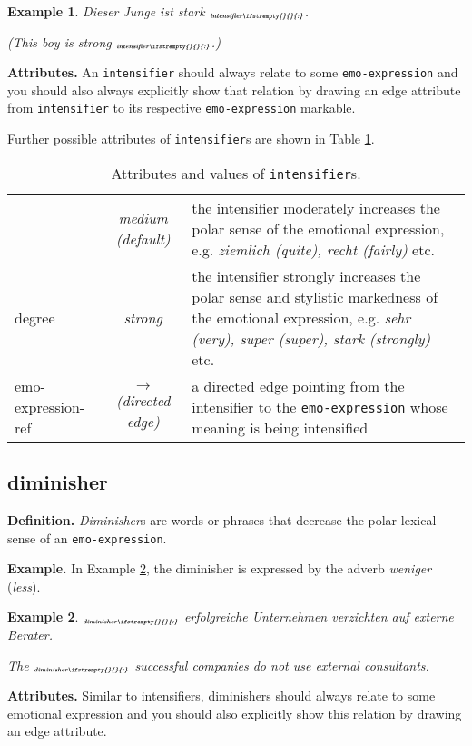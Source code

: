 \documentclass[11pt,a4paper]{article}
\newlength{\clmnwidth}
\theoremstyle{mytheoremstyle}
\newtheorem{exmp}{Example}[section]
\newcommand{\mtag}[2]{{\upshape[\emph{#2}\upshape]$_{\textrm{\bfseries\emph{\tiny
        #1}}}$}}
\newcommand{\intensifier}[2][]{\mtag{in\-ten\-si\-fier\ifstrempty{#1}{}{:#1}}{#2}}
\newcommand{\diminisher}[2][]{\mtag{di\-mi\-ni\-sher\ifstrempty{#1}{}{:#1}}{#2}}
\begin{document}
\begin{exmp}
  Dieser Junge ist stark \intensifier{wie ein Pferd}.

  (This boy is strong \intensifier{as a
    horse}.)\label{exmp:intensifier-comp}
\end{exmp}

\noindent\textbf{Attributes.} An \texttt{intensifier} should always
relate to some \texttt{emo-expression} and you should also always
explicitly show that relation by drawing an edge attribute from
\texttt{intensifier} to its respective \texttt{emo-expression}
markable.

Further possible attributes of \texttt{intensifier}s are shown in
Table \ref{tbl:intensifier}.
\begin{center}
  \begin{table}[htb]
    \caption{Attributes and values of \texttt{intensifier}s.}
    \begin{tabular}{|l|c|p{0.875\clmnwidth}|}\hline

      & \textit{medium (default)} & the intensifier moderately
      increases the polar sense of the emotional expression,
      e.g. \textit{ziemlich (quite), recht (fairly)} etc.\\\cline{2-3}

      \multirow{-2}{*}{degree} & \textit{strong} & the intensifier
      strongly increases the polar sense and stylistic markedness of the
      emotional expression, e.g. \textit{sehr (very), super (super),
        stark (strongly)} etc.\\\hline


      emo-expression-ref & \textit{$\longrightarrow$\newline(directed
        edge)} & a directed edge pointing from the intensifier to the
      \texttt{emo-expression} whose meaning is being intensified\\\hline
    \end{tabular}
    \label{tbl:intensifier}
  \end{table}
\end{center}

\subsection{diminisher}
\noindent\textbf{Definition.} \emph{Diminisher}s are words or phrases
that decrease the polar lexical sense of an \texttt{emo-expression}.

\noindent\textbf{Example.} In Example \ref{exmp:diminisher}, the
diminisher is expressed by the adverb \textit{weniger}
(\textit{less}).
\begin{exmp}
  \diminisher{Weniger} erfolgreiche Unternehmen verzichten auf externe
  Berater.\label{exmp:diminisher}

  The \diminisher{less} successful companies do not use external
  consultants.
\end{exmp}
\noindent\textbf{Attributes.} Similar to intensifiers, diminishers
should always relate to some emotional expression and you should also
explicitly show this relation by drawing an edge attribute.
\end{document}
